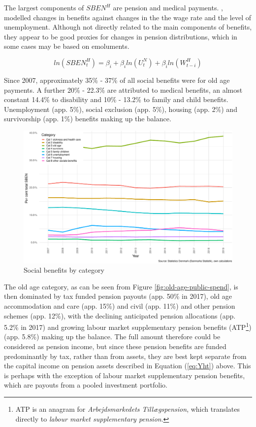 \documentclass[
]{book}
\begin{document}
The largest components of \(SBEN^H\) are pension and medical payments. \citet{byrialsenraza2019empirical},
modelled changes in benefits against changes in the the wage rate and
the level of unemployment. Although not directly related to the main components of
benefits, they appear to be good proxies for changes in pension distributions, which
in some cases may be based on emoluments.

\begin{equation}
ln(SBEN^H_t) = \beta _i + \beta _i ln(U^N_t) + \beta _i ln(W^H_{t-i})
\label{eq:socialbenefits}
\end{equation}

Since 2007, approximately 35\% - 37\% of all social benefits
were for old age payments. A further 20\% - 22.3\% are attributed to medical benefits, an almost
constant 14.4\% to disability and 10\% - 13.2\% to family and child benefits. Unemployment (app. 5\%),
social exclusion (app. 5\%), housing (app. 2\%) and survivorship (app. 1\%) benefits making up the balance.

\begin{figure}
\centering
\includegraphics{figures/sben-all-dk-1.pdf}
\caption{\label{fig:sben-all-dk}Social benefits by category}
\end{figure}

The old age category, as can be seen from Figure \ref{fig:old-age-public-spend},
is then dominated by tax funded pension payouts (app. 50\% in 2017),
old age accommodation and care (app. 15\%) and civil (app. 11\%) and other pension
schemes (app. 12\%), with the declining anticipated pension allocations (app. 5.2\% in 2017)
and growing labour market supplementary pension benefits (ATP\footnote{ATP is an anagram for \emph{Arbejdsmarkedets Tillægspension}, which translates directly to
  \emph{labour market supplementary pension}.}) (app. 5.8\%) making up the
balance. The full amount therefore could be considered as pension income, but since these
pension benefits are funded predominantly by tax, rather than from assets, they are best
kept separate from the capital income on pension assets described in Equation (\ref{eq:Yht})
above. This is perhaps with the exception of labour market supplementary pension benefits, which are
payouts from a pooled investment portfolio.
\end{document}
